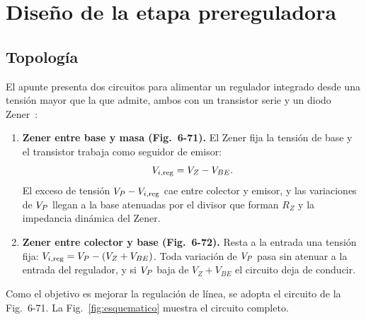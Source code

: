 \section{Diseño de la etapa prereguladora}

\subsection{Topología}
El apunte presenta dos circuitos para alimentar un regulador integrado desde una tensión mayor que la que admite, ambos con un transistor serie y un diodo Zener~\cite[Sec.~6-9-5g]{ap3}:
\begin{enumerate}
    \item \textbf{Zener entre base y masa (Fig.~6-71).} El Zener fija la tensión de base y el transistor trabaja como seguidor de emisor:
    \begin{equation}
        V_{i,\mathrm{reg}} = V_Z - V_{BE}.
        \label{eq:vireg}
    \end{equation}
    El exceso de tensión $V_{P} - V_{i,\mathrm{reg}}$ cae entre colector y emisor, y las variaciones de $V_{P}$ llegan a la base atenuadas por el divisor que forman $R_Z$ y la impedancia dinámica del Zener.
    \item \textbf{Zener entre colector y base (Fig.~6-72).} Resta a la entrada una tensión fija: $V_{i,\mathrm{reg}} = V_{P} - (V_Z + V_{BE})$. Toda variación de $V_{P}$ pasa sin atenuar a la entrada del regulador, y si $V_{P}$ baja de $V_Z + V_{BE}$ el circuito deja de conducir.
\end{enumerate}
Como el objetivo es mejorar la regulación de línea, se adopta el circuito de la Fig.~6-71. La Fig.~\ref{fig:esquematico} muestra el circuito completo.

